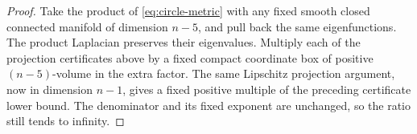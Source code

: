 \begin{proof}
Take the product of \eqref{eq:circle-metric} with any fixed smooth
closed connected manifold of dimension $n-5$, and pull back the
same eigenfunctions. The product Laplacian preserves their
eigenvalues. Multiply each of the projection certificates above
by a fixed compact coordinate box of positive $(n-5)$-volume in
the extra factor. The same Lipschitz projection argument, now in
dimension $n-1$, gives a fixed positive multiple of the preceding
certificate lower bound. The denominator and its fixed exponent
are unchanged, so the ratio still tends to infinity.
\end{proof}
